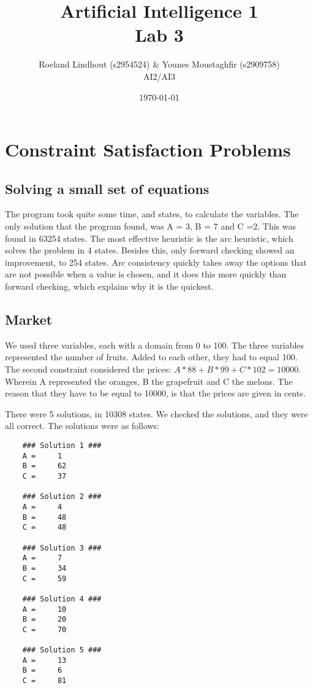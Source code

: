 \documentclass{article}
\title{Artificial Intelligence 1 \\ Lab 3}%
\author{Roeland Lindhout (s2954524) \& Younes Moustaghfir (s2909758) \\ AI2/AI3} %
\date{\today}%
\begin{document}
	
	\maketitle
	
	\section{Constraint Satisfaction Problems}
	
		
	\subsection*{Solving a small set of equations}
	
	The program took quite some time, and states, to calculate the variables. The only solution that the program found, was A = 3, B = 7 and C =2. This was found in 63254 states.
	The most effective heuristic is the arc heuristic, which solves the problem in 4 states. Besides this, only forward checking showed an improvement, to 254 states. Arc consistency quickly takes away the options that are not possible when a value is chosen, and it does this more quickly than forward checking, which explains why it is the quickest.
	
	\subsection*{Market}
	
	We used three variables, each with a domain from 0 to 100. The three variables represented the number of fruits. Added to each other, they had to equal 100. The second constraint considered the prices: $A*88 + B*99 + C*102 = 10000$. Wherein A represented the oranges, B the grapefruit and C the melons. The reason that they have to be equal to 10000, is that the prices are given in cents. 
	
	There were 5 solutions, in 10308 states. We checked the solutions, and they were all correct. The solutions were as follows: 
	\begin{lstlisting}	
	### Solution 1 ###
	A = 	1 
	B = 	62 
	C = 	37 

	### Solution 2 ###
	A = 	4 
	B = 	48 
	C = 	48 

	### Solution 3 ###
	A = 	7 
	B = 	34 
	C = 	59 

	### Solution 4 ###
	A = 	10 
	B = 	20 
	C = 	70 

	### Solution 5 ###
	A = 	13 
	B = 	6 
	C = 	81 
	\end{lstlisting}
	
\end{document}
